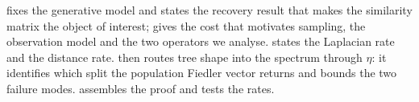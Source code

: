  fixes the generative model and states the recovery result that
makes the similarity matrix the object of interest;  gives the
cost that motivates sampling, the observation model and the two operators we
analyse.  states the Laplacian rate and  the
distance rate.  then routes tree shape into the spectrum through
$\eta$: it identifies which split the population Fiedler vector returns and bounds
the two failure modes.  assembles the proof and
 tests the rates.

